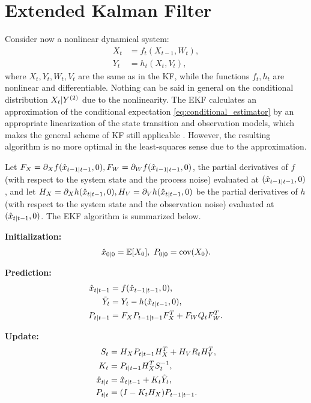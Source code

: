 \section{Extended Kalman Filter}
\label{sec:extend-kalm-filt}

Consider now a nonlinear dynamical system:
\begin{align}
  X_{t} &= f_t(X_{t-1},W_t) ,\\ %
  Y_{t} &= h_t(X_t,V_t) ,\label{eqn:nlsys_obs}
\end{align}
where $X_t, Y_t, W_t, V_t$ are the same as in the KF, while the
functions $f_t, h_t$ are nonlinear and differentiable. Nothing can
be said in general on the conditional distribution $X_t|Y^{(2)}$ due
to the nonlinearity. The EKF calculates an approximation of the
conditional expectation \eqref{eq:conditional_estimator} by an
appropriate linearization of the state transition and observation
models, which makes the general scheme of KF still applicable
\cite{kalman2}. However, the resulting algorithm is no more
optimal in the least-squares sense due to the approximation.

Let $F_X=\partial_X f(\hat{x}_{t-1|t-1}, 0), F_W=\partial_W f(\hat{x}_{t-1|t-1}, 0)$, the
partial derivatives of $f$ (with respect to the system state and
the process noise) evaluated at $(\hat{x}_{t-1|t-1}, 0)$, and let
$H_X=\partial_X h(\hat{x}_{t|t-1}, 0), H_V=\partial_V h(\hat{x}_{t|t-1}, 0)$ be the
partial derivatives of $h$ (with respect to the system state and
the observation noise) evaluated at $(\hat{x}_{t|t-1}, 0)$. The EKF algorithm
is summarized below.

\textbf{Initialization:}
\begin{align}
  \label{eq:EKF_init}
  \hat x_{0|0} = \mathbb{E}[{X_0}], \ P_{0|0} = \mbox{cov}(X_0).
\end{align}

\textbf{Prediction:}
\begin{align}
  \label{eq:EKF_prediction}
  \hat{x}_{t|t-1} &= f(\hat{x}_{t-1|t-1},0) , \\
  {\tilde{Y}}_t &= Y_t - h(\hat{x}_{t|t-1}, 0) ,\\
  P_{t|t-1} &= F_X P_{t-1|t-1} F_X^T + F_WQ_tF_W^T .
\end{align}

\textbf{Update:}
\begin{align}
  \label{eq:EKF_update}
  S_t &= H_X P_{t|t-1} H_X^T + H_VR_tH_V^T , \\
  K_t &= P_{t|t-1}H_X^T S_t^{-1} ,\\
  \hat{x}_{t|t} &= \hat{x}_{t|t-1} + K_t {\tilde{Y}}_t , \\
  P_{t|t} &= (I - K_tH_X) P_{t-1|t-1} .
\end{align}
